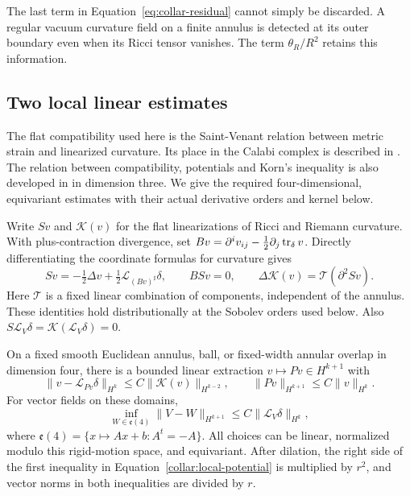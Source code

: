 The last term in Equation~\eqref{eq:collar-residual} cannot simply be
discarded.  A regular vacuum curvature field on a finite annulus is
detected at its outer boundary even when its Ricci tensor vanishes.
The term \(\theta_R/R^2\) retains this information.

\subsection{Two local linear estimates}
\label{collar:local-linear}

The flat compatibility used here is the Saint-Venant relation between
metric strain and linearized curvature. Its place in the Calabi complex
is described in \cite[Section~2.2]{Khavkine2017}. The relation between
compatibility, potentials and Korn's inequality is also developed in
\cite{CiarletCiarlet2005} in dimension three. We give the required
four-dimensional, equivariant estimates with their actual derivative
orders and kernel below.

Write \(Sv\) and \(\mathcal K(v)\) for the flat linearizations of
Ricci and Riemann curvature.  With plus-contraction divergence, set
\(Bv=\partial^iv_{ij}-\tfrac12\partial_j\operatorname{tr}_\delta v\).  Directly
differentiating the coordinate formulas for curvature gives
\begin{equation}
 Sv=-\tfrac12\Delta v+\tfrac12\mathcal L_{(Bv)^\sharp}\delta,
 \qquad BSv=0,
 \qquad
 \Delta\mathcal K(v)=\mathcal T(\partial^2Sv).
 \label{collar:flat-identities}
\end{equation}
Here \(\mathcal T\) is a fixed linear combination of components,
independent of the annulus.  These identities hold distributionally
at the Sobolev orders used below.  Also
\(S\mathcal L_V\delta=\mathcal K(\mathcal L_V\delta)=0\).

\begin{lemma}
\label{collar:potential}
On a fixed smooth Euclidean annulus, ball, or fixed-width annular
overlap in dimension four, there is a bounded linear extraction
\(v\mapsto P v\in H^{k+1}\) with
\begin{equation}
 \|v-\mathcal L_{Pv}\delta\|_{H^k}
       \le C\|\mathcal K(v)\|_{H^{k-2}},
 \qquad \|Pv\|_{H^{k+1}}\le C\|v\|_{H^k}.
 \label{collar:local-potential}
\end{equation}
For vector fields on these domains,
\begin{equation}
 \inf_{W\in\mathfrak e(4)}\|V-W\|_{H^{k+1}}
           \le C\|\mathcal L_V\delta\|_{H^k},
 \label{collar:korn}
\end{equation}
where \(\mathfrak e(4)=\{x\mapsto Ax+b:A^t=-A\}\).
All choices can be linear, normalized modulo this rigid-motion
space, and equivariant.  After dilation, the right side of the first
inequality in Equation~\eqref{collar:local-potential} is multiplied
by \(r^2\), and vector norms in both inequalities are divided by \(r\).
\end{lemma}

